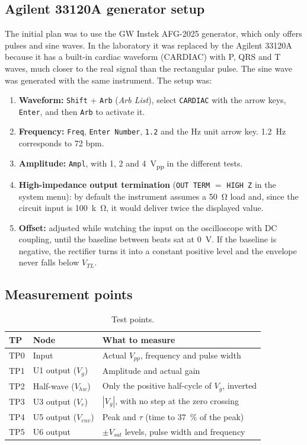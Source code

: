 \documentclass[11pt,letterpaper]{article}
\newcommand{\Vg}{V_g}
\newcommand{\Vr}{V_r}
\newcommand{\Venv}{V_{env}}
\newcommand{\VTL}{V_{TL}}
\newcommand{\Vsat}{V_{sat}}
\begin{document}
\subsection{Agilent 33120A generator setup}
The initial plan was to use the GW Instek AFG-2025 generator, which only offers pulses and sine waves. In the laboratory it was replaced by the Agilent 33120A because it has a built-in cardiac waveform (CARDIAC) with P, QRS and T waves, much closer to the real signal than the rectangular pulse. The sine wave was generated with the same instrument. The setup was:
\begin{enumerate}
  \item \textbf{Waveform:} \texttt{Shift} + \texttt{Arb} (\textit{Arb List}), select \texttt{CARDIAC} with the arrow keys, \texttt{Enter}, and then \texttt{Arb} to activate it.
  \item \textbf{Frequency:} \texttt{Freq}, \texttt{Enter Number}, \texttt{1.2} and the Hz unit arrow key. \SI{1.2}{Hz} corresponds to 72 bpm.
  \item \textbf{Amplitude:} \texttt{Ampl}, with 1, 2 and \SI{4}{V_{pp}} in the different tests.
  \item \textbf{High-impedance output termination} (\texttt{OUT TERM} $=$ \texttt{HIGH Z} in the system menu): by default the instrument assumes a \SI{50}{\ohm} load and, since the circuit input is \SI{100}{k\ohm}, it would deliver twice the displayed value.
  \item \textbf{Offset:} adjusted while watching the input on the oscilloscope with DC coupling, until the baseline between beats sat at \SI{0}{V}. If the baseline is negative, the rectifier turns it into a constant positive level and the envelope never falls below $\VTL$.
\end{enumerate}

\subsection{Measurement points}

\begin{table}[H]
\centering
\caption{Test points.}\label{tab:tp}
\begin{tabularx}{\linewidth}{@{}llX@{}}
\toprule
TP & Node & What to measure \\
\midrule
TP0 & Input & Actual $V_{pp}$, frequency and pulse width \\
TP1 & U1 output ($\Vg$) & Amplitude and actual gain \\
TP2 & Half-wave ($V_{hw}$) & Only the positive half-cycle of $\Vg$, inverted \\
TP3 & U3 output ($\Vr$) & $|\Vg|$, with no step at the zero crossing \\
TP4 & U5 output ($\Venv$) & Peak and $\tau$ (time to \SI{37}{\percent} of the peak) \\
TP5 & U6 output & $\pm\Vsat$ levels, pulse width and frequency \\
\bottomrule
\end{tabularx}
\end{table}
\end{document}

